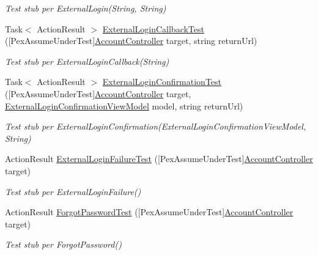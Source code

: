 \begin{DoxyCompactItemize}
\begin{DoxyCompactList}\small\item\em Test stub per External\+Login(\+String, String)\end{DoxyCompactList}\item 
Task$<$ Action\+Result $>$ \mbox{\hyperlink{class_brew_day2_1_1_tests_1_1_account_controller_test_ab7f835ced9e7b4d2efe32047a75cb17b}{External\+Login\+Callback\+Test}} (\mbox{[}Pex\+Assume\+Under\+Test\mbox{]}\mbox{\hyperlink{class_brew_day2_1_1_controllers_1_1_account_controller}{Account\+Controller}} target, string return\+Url)
\begin{DoxyCompactList}\small\item\em Test stub per External\+Login\+Callback(\+String)\end{DoxyCompactList}\item 
Task$<$ Action\+Result $>$ \mbox{\hyperlink{class_brew_day2_1_1_tests_1_1_account_controller_test_a2bc871c6f44c952b559975d7b5fa61d4}{External\+Login\+Confirmation\+Test}} (\mbox{[}Pex\+Assume\+Under\+Test\mbox{]}\mbox{\hyperlink{class_brew_day2_1_1_controllers_1_1_account_controller}{Account\+Controller}} target, \mbox{\hyperlink{class_brew_day2_1_1_models_1_1_external_login_confirmation_view_model}{External\+Login\+Confirmation\+View\+Model}} model, string return\+Url)
\begin{DoxyCompactList}\small\item\em Test stub per External\+Login\+Confirmation(\+External\+Login\+Confirmation\+View\+Model, String)\end{DoxyCompactList}\item 
Action\+Result \mbox{\hyperlink{class_brew_day2_1_1_tests_1_1_account_controller_test_ac772e1db4e993a58cb1c3b031fcbfecf}{External\+Login\+Failure\+Test}} (\mbox{[}Pex\+Assume\+Under\+Test\mbox{]}\mbox{\hyperlink{class_brew_day2_1_1_controllers_1_1_account_controller}{Account\+Controller}} target)
\begin{DoxyCompactList}\small\item\em Test stub per External\+Login\+Failure()\end{DoxyCompactList}\item 
Action\+Result \mbox{\hyperlink{class_brew_day2_1_1_tests_1_1_account_controller_test_a3b8646f50c34fc99c5767b20461b66cf}{Forgot\+Password\+Test}} (\mbox{[}Pex\+Assume\+Under\+Test\mbox{]}\mbox{\hyperlink{class_brew_day2_1_1_controllers_1_1_account_controller}{Account\+Controller}} target)
\begin{DoxyCompactList}\small\item\em Test stub per Forgot\+Password()\end{DoxyCompactList}\item 

\end{DoxyCompactItemize}
